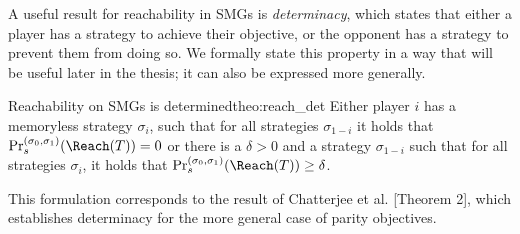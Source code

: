 A useful result for reachability in SMGs is \textit{determinacy}, which states that either a player has a strategy to achieve their objective, or the opponent has a strategy to prevent them from doing so. We formally state this property in a way that will be useful later in the thesis; it can also be expressed more generally.
\begin{mytheorem}{Reachability on SMGs is determined}{theo:reach_det}\label{theo:reach_det}
Either player $i$ has a memoryless strategy $\sigma_i$, such that for all strategies $\sigma_{1-i}$ it holds that $\Pr_s^{(\sigma_0, \sigma_1)}(\Reach(T))=0$ or there is a $\delta > 0$ and a strategy $\sigma_{1-i}$ such that for all strategies $\sigma_i$, it holds that $\Pr_s^{(\sigma_0, \sigma_1)}(\Reach(T)) \geq \delta$.
\end{mytheorem}
This formulation corresponds to the result of Chatterjee et al. \cite{Chatterjee07_StochasticOmegaRegularGames}[Theorem 2], which establishes determinacy for the more general case of parity objectives.
